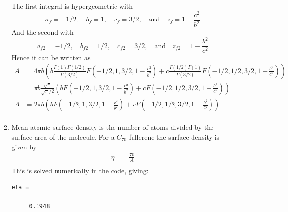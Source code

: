 \documentclass{X:/Documents/Coding/Latex/myassignment}
\begin{document}
\begin{enumerate}
\begin{enumerate}
	The first integral is hypergeometric with 
	\[a_f = -1/2,\quad  b_f = 1,\quad  c_f = 3/2, \quad \text{and} \quad z_f = 1-\frac{c^2}{b^2}\]
	And the second with
	\[a_{f2} = -1/2,\quad b_{f2} = 1/2,\quad  c_{f2} = 3/2, \quad \text{and} \quad z_{f2} = 1 -\frac{b^2}{c^2}\]
	Hence it can be written as
	\begin{align*}
		A &= 4\pi b \left(b \frac{\Gamma(1) \Gamma(1/2)}{\Gamma(3/2)} F\left(-1/2,1,3/2,1- \frac{c^2}{b^2}\right) + c\frac{\Gamma(1/2) \Gamma(1)}{\Gamma(3/2)} F\left(-1/2,1/2,3/2, 1- \frac{b^2}{c^2}\right) \right)\\
		&= \pi b \frac{\sqrt{\pi} }{\sqrt{\pi}/2} \left(bF\left(-1/2,1,3/2,1- \frac{c^2}{b^2}\right) + cF\left(-1/2,1/2,3/2,1 - \frac{b^2}{c^2}\right)  \right)\\
		A&= 2\pi b \left(bF\left(-1/2,1,3/2,1- \frac{c^2}{b^2}\right) + cF\left(-1/2,1/2,3/2,1 -\frac{b^2}{c^2}\right)  \right)\\
	\end{align*}

	\item Mean atomic surface density is the number of atoms divided by the surface area of the molecule. For a $C_{70}$ fullerene the surface density is given by
	\begin{align*}
		\eta &= \frac{70}{A}\\
	\end{align*}
 	This is solved numerically in the code, giving:
 	\begin{lstlisting}
eta =

     0.1948
 	\end{lstlisting}
\end{enumerate}


\end{enumerate}
\end{document}
